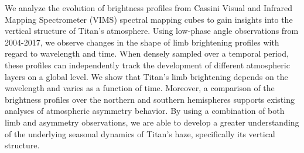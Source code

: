 \documentclass[12pt]{article}
\begin{document}
\maketitle
\vspace{-1\baselineskip} %

We analyze the evolution of brightness profiles from Cassini Visual and
Infrared Mapping Spectrometer (VIMS) spectral mapping cubes to gain
insights into the vertical structure of Titan's atmosphere. Using
low-phase angle observations from 2004-2017, we observe changes in the
shape of limb brightening profiles with regard to wavelength and time.
When densely sampled over a temporal period, these profiles can
independently track the development of different atmospheric layers on a
global level. We show that Titan's limb brightening depends on the
wavelength and varies as a function of time. Moreover, a comparison of
the brightness profiles over the northern and southern hemispheres
supports existing analyses of atmospheric asymmetry behavior. By using a
combination of both limb and asymmetry observations, we are able to
develop a greater understanding of the underlying seasonal dynamics of
Titan's haze, specifically its vertical structure.
\end{document}
